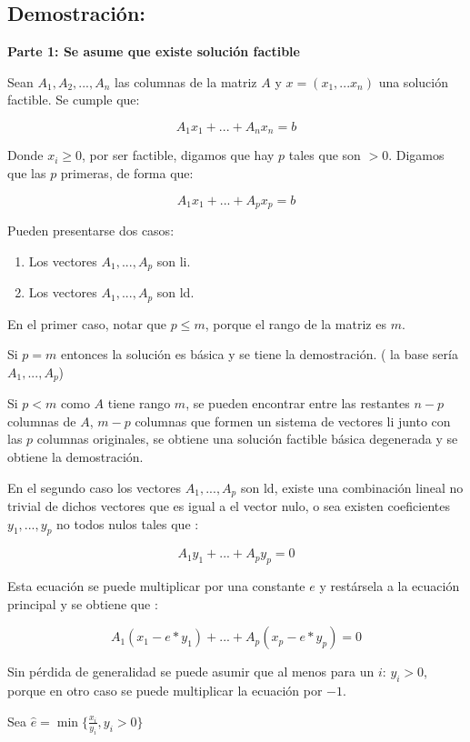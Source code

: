 \documentclass[14pt]{extarticle}
\begin{document}
\subsection{Demostración:}

\textbf{Parte 1: Se asume que existe solución factible}

Sean $A_1, A_2, ..., A_n$ las columnas de la matriz $A$ y $x = (x_1, ... x_n)$ una solución factible. Se cumple que:

$$A_1x_1 + ... + A_nx_n = b$$

Donde $x_i \geq 0$, por ser factible, digamos que hay $p$ tales que son $>0$. Digamos que las $p$ primeras, de forma que:

$$A_1x_1 + ... + A_px_p = b$$

Pueden presentarse dos casos:

\begin{enumerate}
	\item Los vectores $A_1, ..., A_p$ son li.
	\item Los vectores $A_1, ..., A_p$ son ld.
\end{enumerate}

En el primer caso, notar que $p \leq m$, porque el rango de la matriz es $m$.

Si $p = m$ entonces la solución es básica y se tiene la demostración. ( la base sería $A_1, ..., A_p$)

Si $p < m$ como $A$ tiene rango $m$, se pueden encontrar entre las restantes $n - p$ columnas de $A$, $m-p$ columnas que formen un sistema de vectores li junto con las $p$ columnas originales, se obtiene una solución factible básica degenerada y se obtiene la demostración.

En el segundo caso los vectores $A_1, ..., A_p$ son ld, existe una combinación lineal no trivial de dichos vectores que es igual a el vector nulo, o sea existen coeficientes $y_1, ..., y_p$ no todos nulos tales que :

$$A_1y_1 + ... + A_py_p = 0$$

Esta ecuación se puede multiplicar por una constante $e$ y restársela a la ecuación principal y se obtiene que :

$$A_1(x_1 - e*y_1) + ... + A_p(x_p - e*y_p) = 0$$

Sin pérdida de generalidad se puede asumir que al menos para un $i$: $y_i > 0$, porque en otro caso se puede multiplicar la ecuación por $-1$.

Sea $\hat{e} = \min \{ \frac{x_i}{y_i}, y_i > 0 \}$
\end{document}
